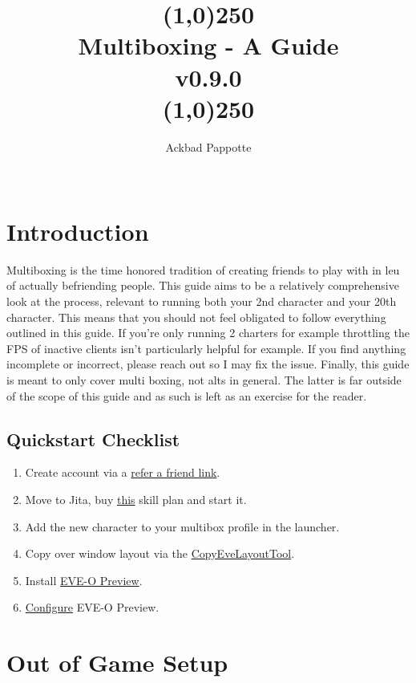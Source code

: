 \documentclass{article}
\title{
  \line(1,0){250} \\
  \textbf{Multiboxing - A Guide} \\
  v0.9.0 \\
  \line(1,0){250}
  }
\author{ 
  Ackbad Pappotte \\\
  }
\begin{document}



\maketitle

\section{Introduction}
Multiboxing is the time honored tradition of creating friends to play with in leu of actually befriending people. This guide aims to be a 
relatively comprehensive look at the process, relevant to running both your 2nd character and your 20th character. This means that you 
should not feel obligated to follow everything outlined in this guide. If you're only running 2 charters for example throttling the FPS of
inactive clients isn't particularly helpful for example. If you find anything incomplete or incorrect, please reach out so I may fix the
issue. Finally, this guide is meant to only cover multi boxing, not alts in general. The latter is far outside of the scope of this guide
and as such is left as an exercise for the reader.

\subsection{Quickstart Checklist}
\begin{enumerate}
  \item Create account via a \href{https://www.eveonline.com/signup?invc=79ffb3de-ef43-400b-a568-e45ac72c6715}{refer a friend link}.
  \item Move to Jita, buy \hyperref[generalSkillplan]{this} skill plan and start it.
  \item Add the new character to your multibox profile in the launcher.
  \item Copy over window layout via the \href{https://github.com/kshannoninnes/CopyEveLayoutTool}{CopyEveLayoutTool}.
  \item Install \href{https://github.com/Proopai/eve-o-preview/releases}{EVE-O Preview}.
  \item \href{https://github.com/Proopai/eve-o-preview}{Configure} EVE-O Preview.
\end{enumerate}

\clearpage
\section{Out of Game Setup}
\end{document}
